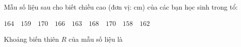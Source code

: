 \begin{ex}
Mẫu số liệu sau cho biết chiều cao (đơn vị: cm) của các bạn học sinh trong tổ:
\begin{center}
$164 \quad 159 \quad 170 \quad 166 \quad 163 \quad 168 \quad 170 \quad 158 \quad 162$
\end{center}
Khoảng biến thiên $R$ của mẫu số liệu là
\end{ex}
